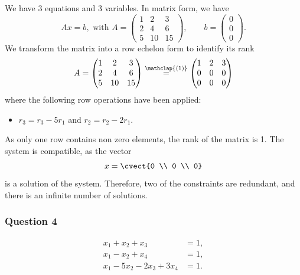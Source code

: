 We have 3 equations and 3 variables. In matrix form, we have
\[
Ax = b, \text{ with } A= \begin{pmatrix}
1&2&3\\ 2&4&6\\ 5&10&15
\end{pmatrix}, \qquad b = \begin{pmatrix}
0\\0\\0
\end{pmatrix}.
\]
We transform the matrix into a row echelon form to identify its rank
\[
A=
\begin{pmatrix}
  1 & 2 & 3 \\ 2 & 4 & 6 \\ 5 & 10 & 15 
\end{pmatrix}
\stackrel{\mathclap{(1)}}{=}
\begin{pmatrix}
  1 & 2 & 3 \\ 0 & 0 & 0 \\ 0 & 0 & 0 
\end{pmatrix}
\]
where the following row operations have been applied:
\begin{itemize}
\item[(1)] $r_3 = r_3 - 5r_1$ and $r_2=r_2-2r_1$.
\end{itemize}
As only one row contains non zero elements, the rank of the matrix is 1. 
The system is compatible, as the vector
\[
x=\cvect{0 \\ 0 \\ 0}
\]
is a solution of the system. Therefore, two of the constraints are
redundant, and there is an infinite number of solutions.

\subsubsection*{Question 4}
\begin{align*}
x_1 + x_2 + x_3 &= 1,\\
x_1 - x_2 + x_4 &= 1, \\
x_1 -5x_2 -2x_3 +3x_4 &= 1.
\end{align*}

